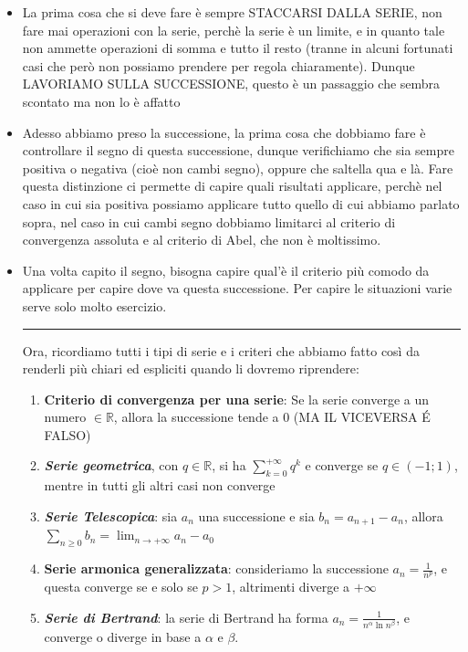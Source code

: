 \documentclass{article}
\theoremstyle{definition}
\newcommand{\R}{\mathbb{R}}
\begin{document}
\begin{itemize}
    \item La prima cosa che si deve fare è sempre STACCARSI DALLA SERIE, non fare mai operazioni con la serie, perchè la serie è un limite, e in quanto tale non ammette operazioni di somma e tutto il resto (tranne in alcuni fortunati casi che però non possiamo prendere per regola chiaramente). Dunque LAVORIAMO SULLA SUCCESSIONE, questo è un passaggio che sembra scontato ma non lo è affatto
    \item Adesso abbiamo preso la successione, la prima cosa che dobbiamo fare è controllare il segno di questa successione, dunque verifichiamo che sia sempre positiva o negativa (cioè non cambi segno), oppure che saltella qua e là. Fare questa distinzione ci permette di capire quali risultati applicare, perchè nel caso in cui sia positiva possiamo applicare tutto quello di cui abbiamo parlato sopra, nel caso in cui cambi segno dobbiamo limitarci al criterio di convergenza assoluta e al criterio di Abel, che non è moltissimo.
    \item Una volta capito il segno, bisogna capire qual'è il criterio più comodo da applicare per capire dove va questa successione. Per capire le situazioni varie serve solo molto esercizio.
    \\
    \vspace{15pt}
    \hrule
    \vspace{15pt}
    Ora, ricordiamo tutti i tipi di serie e i criteri che abbiamo fatto così da renderli più chiari ed espliciti quando li dovremo riprendere:
    \begin{enumerate}
        \item \textbf{Criterio di convergenza per una serie}: Se la serie converge a un numero $\in \R$, allora la successione tende a 0 (MA IL VICEVERSA \'E FALSO)
        \item \textbf{\textit{Serie geometrica}}, con $q \in \R$, si ha $\sum_{k=0}^{+\infty} q^k$ e converge se $q \in (-1;1)$, mentre in tutti gli altri casi non converge
        \item \textbf{\textit{Serie Telescopica}}: sia $a_n$ una successione e sia $b_n=a_{n+1}-a_n$, allora $\sum _{n \geqslant 0}b_n=\lim_{n \to +\infty}a_n - a_0$
        \item \textbf{Serie armonica generalizzata}: consideriamo la successione $a_n=\frac{1}{n^p}$, e questa converge se e solo se $p > 1$, altrimenti diverge a $+ \infty$
        \item \textbf{\textit{Serie di Bertrand}}: la serie di Bertrand ha forma $a_n=\frac{1}{n^\alpha \ln{n^\beta}}$, e converge o diverge in base a $\alpha$ e $\beta$. \\

\end{enumerate}
\end{itemize}
\end{document}
